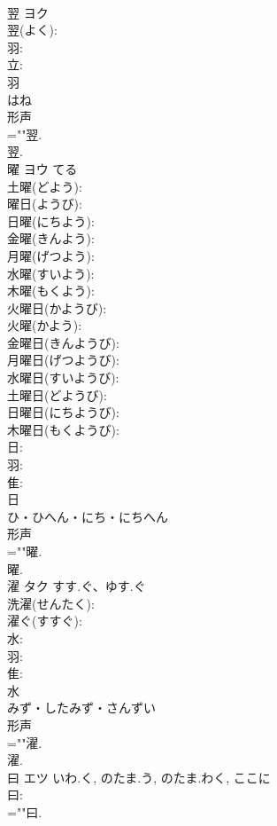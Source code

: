 \documentclass[8pt]{extreport}
\begin{document}
\begin{CJK}{UTF8}{min}
\\	翌	ヨク			
\\	翌(よく): 
\\	羽: 
\\	立: 
\\	羽	
\\	はね	
\\	形声 
\\	=""翌.
\\	翌.
\\	曜	ヨウ		てる	
\\	土曜(どよう): 
\\	曜日(ようび): 
\\	日曜(にちよう): 
\\	金曜(きんよう): 
\\	月曜(げつよう): 
\\	水曜(すいよう): 
\\	木曜(もくよう): 
\\	火曜日(かようび): 
\\	火曜(かよう): 
\\	金曜日(きんようび): 
\\	月曜日(げつようび): 
\\	水曜日(すいようび): 
\\	土曜日(どようび): 
\\	日曜日(にちようび): 
\\	木曜日(もくようび): 
\\	日: 
\\	羽: 
\\	隹: 
\\	日	
\\	ひ・ひへん・にち・にちへん	
\\	形声 
\\	=""曜.
\\	曜.
\\	濯	タク	すす.ぐ、ゆす.ぐ		
\\	洗濯(せんたく): 
\\	濯ぐ(すすぐ): 
\\	水: 
\\	羽: 
\\	隹: 
\\	水	
\\	みず・したみず・さんずい	
\\	形声 
\\	=""濯.
\\	濯.
\\	曰	エツ	いわ.く, のたま.う, のたま.わく, ここに		
\\	曰: 
\\	=""曰.

\end{CJK}
\end{document}
